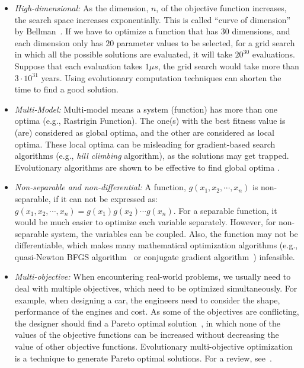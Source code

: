 \begin{itemize}

\item \textit{High-dimensional:} As the dimension, $n$, of the objective function increases, the search space increases exponentially. This is called ``curve of dimension'' by Bellman~\cite{Bellman1957}. If we have to optimize a function that has $30$ dimensions, and each dimension only has $20$ parameter values to be selected, for a grid search in which all the possible solutions are evaluated, it will take $20^{30}$ evaluations. Suppose that each evaluation takes $1\mu s$, the grid search would take more than $3\cdot 10^{31}$ years. Using evolutionary computation techniques can shorten the time to find a good solution. 

\item \textit{Multi-Model:} Multi-model means a system (function) has more than one optima (e.g., Rastrigin Function). The one(s) with the best fitness value is (are) considered as global optima, and the other are considered as local optima. These local optima can be misleading for gradient-based search algorithms (e.g., \textit{hill climbing} algorithm), as the solutions may get trapped. Evolutionary algorithms are shown to be effective to find global optima \cite{Hansen2003}. %

\item \textit{Non-separable and non-differential:} A function, $g(x_1, x_2, \cdots, x_n)$ is non-separable, if it can not be expressed as: $g(x_1, x_2, \cdots, x_n) = g(x_1)g(x_2) \cdots g(x_n)$. For a separable function, it would be much easier to optimize each variable separately. However, for non-separable system, the variables can be coupled. Also, the function may not be differentiable, which makes many mathematical optimization algorithms (e.g., quasi-Newton BFGS algorithm~\cite{Dennis1977} or conjugate gradient algorithm~\cite{Shewchuk1994}) infeasible. %

\item \textit{Multi-objective:} When encountering real-world problems, we usually need to deal with multiple objectives, which need to be optimized simultaneously. For example, when designing a car, the engineers need to consider the shape, performance of the engines and cost. As some of the objectives are conflicting, the designer should find a Pareto optimal solution~\cite{Fonseca1995}, in which none of the values of the objective functions can be increased without decreasing the value of other objective functions. Evolutionary multi-objective optimization is a technique to generate Pareto optimal solutions. For a review, see~\cite{Fonseca1995}. 

\end{itemize}

